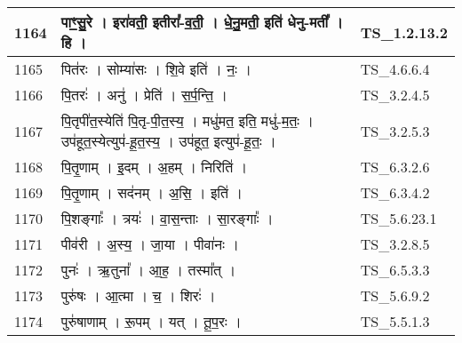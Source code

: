 \documentclass[17pt]{extarticle}
\begin{document}
\begin{longtable}{||p{0.4in}||p{4.9in}||p{0.9in}||}
    \hline
        
    1164 & पाꣳ॒॒सु॒रे   ।   इरा॑वती॒ इतीरा᳚{-}व॒ती॒   ।   धे॒नु॒मती॒ इति॑ धेनु{-}मती᳚   ।   हि   ।    & TS\_1.2.13.2       \\
    
    \hline
        
    1165 & पित॑रः   ।   सोम्या॑सः   ।   शि॒वे इति॑   ।   नः॒   ।    & TS\_4.6.6.4       \\
    
    \hline
        
    1166 & पि॒तरः॑   ।   अनु॑   ।   प्रेति॑   ।   स॒र्प॒न्ति॒   ।    & TS\_3.2.4.5       \\
    
    \hline
        
    1167 & पि॒तृपी॑त॒स्येति॑ पि॒तृ{-}पी॒त॒स्य॒   ।   मधु॑मत॒ इति॒ मधु॑{-}म॒तः॒   ।   उप॑हूत॒स्येत्युप॑{-}हू॒त॒स्य॒   ।   उप॑हूत॒ इत्युप॑{-}हू॒तः॒   ।    & TS\_3.2.5.3       \\
    
    \hline
        
    1168 & पि॒तृ॒णाम्   ।   इ॒दम्   ।   अ॒हम्   ।   निरिति॑   ।    & TS\_6.3.2.6       \\
    
    \hline
        
    1169 & पि॒तृ॒णाम्   ।   सद॑नम्   ।   अ॒सि॒   ।   इति॑   ।    & TS\_6.3.4.2       \\
    
    \hline
        
    1170 & पि॒शङ्गाः᳚   ।   त्रयः॑   ।   वा॒स॒न्ताः   ।   सा॒रङ्गाः᳚   ।    & TS\_5.6.23.1       \\
    
    \hline
        
    1171 & पीव॑री   ।   अ॒स्य॒   ।   जा॒या   ।   पीवा॑नः   ।    & TS\_3.2.8.5       \\
    
    \hline
        
    1172 & पुनः॑   ।   ऋ॒तुना᳚   ।   आ॒ह॒   ।   तस्मा᳚त्   ।    & TS\_6.5.3.3       \\
    
    \hline
        
    1173 & पुरु॑षः   ।   आ॒त्मा   ।   च॒   ।   शिरः॑   ।    & TS\_5.6.9.2       \\
    
    \hline
        
    1174 & पुरु॑षाणाम्   ।   रू॒पम्   ।   यत्   ।   तू॒प॒रः   ।    & TS\_5.5.1.3       \\
    

\end{longtable}
\end{document}
